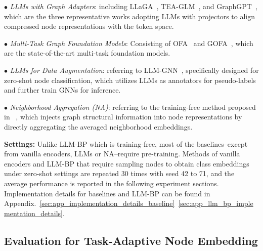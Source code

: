 $\bullet$ \textit{LLMs with Graph Adapters}: including LLaGA~\cite{chen2024llaga}, TEA-GLM~\cite{wang2024llms}, and GraphGPT~\cite{tang2024graphgpt}, which are the three representative works adopting LLMs with projectors to align compressed node representations with the token space.%

$\bullet$ \textit{Multi-Task Graph Foundation Models}: Consisting of OFA~\cite{liu2023one} and GOFA~\cite{kong2024gofa}, which are the state-of-the-art multi-task foundation models.

$\bullet$ \textit{LLMs for Data Augmentation}: referring to LLM-GNN~\cite{chen2023label}, specifically designed for zero-shot node classification, which utilizes LLMs as annotators for pseudo-labels and further train GNNs for inference.

$\bullet$ \textit{Neighborhood Aggregation (NA)}: referring to the training-free method proposed in ~\cite{yang2024gl}, which injects graph structural information into node representations by directly aggregating the averaged neighborhood embeddings.

\textbf{Settings:} Unlike LLM-BP which is training-free, most of the baselines--except from vanilla encoders, LLMs or NA--require pre-training. Methods of vanilla encoders and LLM-BP that require sampling nodes to obtain class embeddings under zero-shot settings are repeated 30 times with seed 42 to 71, and the average performance is reported in the following experiment sections. Implementation details for baselines and LLM-BP can be found in Appendix.~\ref{sec:app_implementation_details_baseline}~\ref{sec:app_llm_bp_implementation_details}.

\subsection{Evaluation for Task-Adaptive Node Embedding}
%

 

